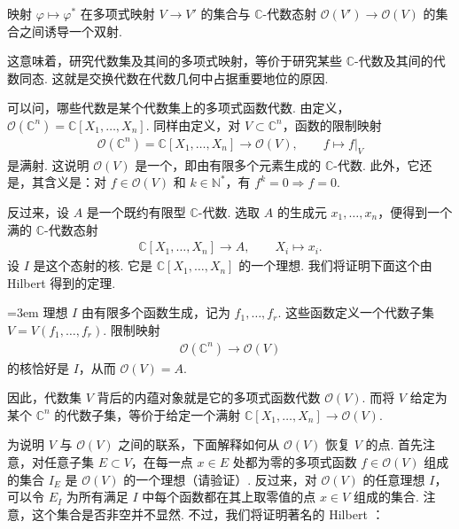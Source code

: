 \begin{theorem*}
映射 $\varphi\longmapsto\varphi^*$ 在多项式映射 $V\longrightarrow V'$ 的集合与 $\mathbb{C}$-代数态射 $\mathcal{O}(V')\longrightarrow\mathcal{O}(V)$ 的集合之间诱导一个双射.
\end{theorem*}

这意味着，研究代数集及其间的多项式映射，等价于研究某些 $\mathbb{C}$-代数及其间的代数同态. 这就是交换代数在代数几何中占据重要地位的原因.

可以问，哪些代数是某个代数集上的多项式函数代数. 由定义，$\mathcal{O}(\mathbb{C}^{n})=\mathbb{C}[X_1,\dots,X_n]$. 同样由定义，对 $V\subset\mathbb{C}^{n}$，函数的限制映射
\begin{align*}
\mathcal{O}(\mathbb{C}^{n})=\mathbb{C}[X_1,\dots,X_n]
\longrightarrow\mathcal{O}(V),\qquad f\longmapsto f|_V
\end{align*}
是满射. 这说明 $\mathcal{O}(V)$ 是一个，即由有限多个元素生成的 $\mathbb{C}$-代数. 此外，它还是，其含义是：对 $f\in\mathcal{O}(V)$ 和 $k\in\mathbb{N}^*$，有 $f^k=0\Rightarrow f=0$.

反过来，设 $A$ 是一个既约有限型 $\mathbb{C}$-代数. 选取 $A$ 的生成元 $x_1,\dots,x_n$，便得到一个满的 $\mathbb{C}$-代数态射
\begin{align*}
\mathbb{C}[X_1,\dots,X_n]\longrightarrow A,
\qquad X_i\longmapsto x_i.
\end{align*}
设 $I$ 是这个态射的核. 它是 $\mathbb{C}[X_1,\dots,X_n]$ 的一个理想. 我们将证明下面这个由 Hilbert 得到的定理.

\begin{theorem*}
\emergencystretch=3em
理想 $I$ 由有限多个函数生成，记为 $f_1,\dots,f_r$. 这些函数定义一个代数子集 $V=V(f_1,\dots,f_r)$. 限制映射
\begin{align*}
\mathcal{O}(\mathbb{C}^{n})\longrightarrow\mathcal{O}(V)
\end{align*}
的核恰好是 $I$，从而 $\mathcal{O}(V)=A$.
\end{theorem*}

因此，代数集 $V$ 背后的内蕴对象就是它的多项式函数代数 $\mathcal{O}(V)$. 而将 $V$ 给定为某个 $\mathbb{C}^{n}$ 的代数子集，等价于给定一个满射 $\mathbb{C}[X_1,\dots,X_n]\longrightarrow\mathcal{O}(V)$.

为说明 $V$ 与 $\mathcal{O}(V)$ 之间的联系，下面解释如何从 $\mathcal{O}(V)$ 恢复 $V$ 的点. 首先注意，对任意子集 $E\subset V$，在每一点 $x\in E$ 处都为零的多项式函数 $f\in\mathcal{O}(V)$ 组成的集合 $I_E$ 是 $\mathcal{O}(V)$ 的一个理想（请验证）. 反过来，对 $\mathcal{O}(V)$ 的任意理想 $I$，可以令 $E_I$ 为所有满足 $I$ 中每个函数都在其上取零值的点 $x\in V$ 组成的集合. 注意，这个集合是否非空并不显然. 不过，我们将证明著名的 Hilbert ：


